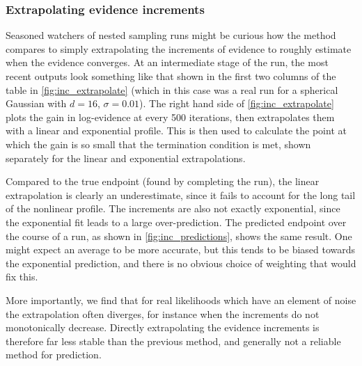 \documentclass[usenatbib]{mnras}
\begin{document}
\subsubsection{Extrapolating evidence increments}
Seasoned watchers of nested sampling runs might be curious how the method compares to simply extrapolating the increments of evidence to roughly estimate when the evidence converges. At an intermediate stage of the run, the most recent outputs look something like that shown in the first two columns of the table in \cref{fig:inc_extrapolate} (which in this case was a real run for a spherical Gaussian with $d = 16$, $\sigma = 0.01$). The right hand side of \cref{fig:inc_extrapolate} plots the gain in log-evidence at every 500 iterations, then extrapolates them with a linear and exponential profile. This is then used to calculate the point at which the gain is so small that the termination condition is met, shown separately for the linear and exponential extrapolations.
\par
Compared to the true endpoint (found by completing the run), the linear extrapolation is clearly an underestimate, since it fails to account for the long tail of the nonlinear profile. The increments are also not exactly exponential, since the exponential fit leads to a large over-prediction. The predicted endpoint over the course of a run, as shown in \cref{fig:inc_predictions}, shows the same result. One might expect an average to be more accurate, but this tends to be biased towards the exponential prediction, and there is no obvious choice of weighting that would fix this.
\par
More importantly, we find that for real likelihoods which have an element of noise the extrapolation often diverges, for instance when the increments do not monotonically decrease. Directly extrapolating the evidence increments is therefore far less stable than the previous method, and generally not a reliable method for prediction.
\end{document}

